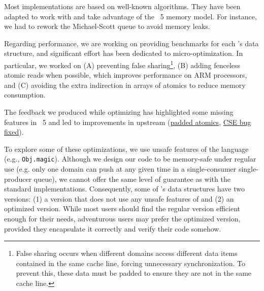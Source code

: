 \documentclass[a4paper, 11pt]{article}
\begin{document}
Most implementations are based on well-known algorithms.
They have been adapted to work with and take advantage of the \OCaml~5 memory model.
For instance, we had to rework the Michael-Scott queue to avoid memory leaks.

Regarding performance, we are working on providing benchmarks for each \Saturn's data structure, and significant effort has been dedicated to micro-optimization. In particular, we worked on
(A) preventing false sharing\footnote[1]{False sharing occurs when different domains access different data items contained in the same cache line, forcing unnecessary synchronization. To prevent this, these data must be padded to ensure they are not in the same cache line.},
(B) adding fenceless atomic reads when possible, which improves performance on ARM processors, and
(C) avoiding the extra indirection in arrays of atomics to reduce memory consumption.

The feedback we produced while optimizing \Saturn has highlighted some missing features in \OCaml~5 and led to improvements in upstream \OCaml (\href{https://github.com/ocaml/ocaml/pull/12212}{padded atomics}, \href{https://github.com/ocaml/ocaml/pull/12715}{CSE bug fixed}).

To explore some of these optimizations, we use unsafe features of the language (e.g., \texttt{Obj.magic}). Although we design our code to be memory-safe under regular use (e.g. only one domain can push at any given time in a single-consumer single-producer queue), we cannot offer the same level of guarantee as with the standard implementations. Consequently, some of \Saturn's data structures have two versions: (1) a version that does not use any unsafe features of \OCaml and (2) an optimized version. While most users should find the regular version efficient enough for their needs, adventurous users may prefer the optimized version, provided they encapsulate it correctly and verify their code somehow.


\end{document}
